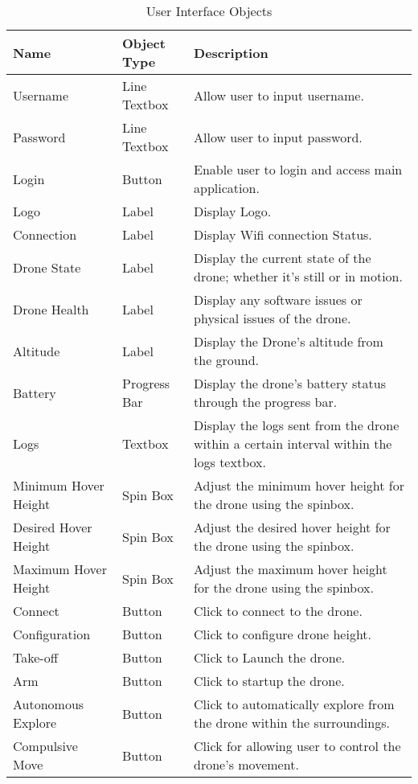 \documentclass[12pt]{article}
\begin{document}
\begin{longtable}{| p{4cm} | p{4cm} | p{7cm} |}
\caption {User Interface Objects}
\label{tab:UserInterfaceObjects} \\
\hline
\textbf{Name} & \textbf{Object Type} & \textbf{Description} \\
\hline
\endhead
Username & Line Textbox & Allow user to input username. \\
\hline
Password & Line Textbox & Allow user to input password. \\
\hline
Login & Button & Enable user to login and access main application. \\
\hline
Logo & Label & Display Logo. \\
\hline
Connection & Label & Display Wifi connection Status. \\
\hline
Drone State & Label & Display the current state of the drone; whether it’s still or in motion. \\
\hline
Drone Health & Label & Display any software issues or physical issues of the drone. \\
\hline
Altitude & Label & Display the Drone’s altitude from the ground. \\
\hline
Battery & Progress Bar & Display the drone's battery status through the progress bar. \\
\hline
Logs & Textbox & Display the logs sent from the drone within a certain interval within the logs textbox. \\
\hline
Minimum Hover Height & Spin Box & Adjust the minimum hover height for the drone using the spinbox. \\
\hline
Desired Hover Height & Spin Box & Adjust the desired hover height for the drone using the spinbox. \\
\hline
Maximum Hover Height & Spin Box & Adjust the maximum hover height for the drone using the spinbox. \\
\hline
Connect & Button & Click to connect to the drone. \\
\hline
Configuration & Button & Click to configure drone height. \\
\hline
Take-off & Button & Click to Launch the drone. \\
\hline
Arm & Button & Click to startup the drone. \\
\hline
Autonomous Explore & Button & Click to automatically explore from the drone within the surroundings. \\
\hline
Compulsive Move & Button & Click for allowing user to control the  drone’s movement. \\

\end{longtable}
\end{document}
